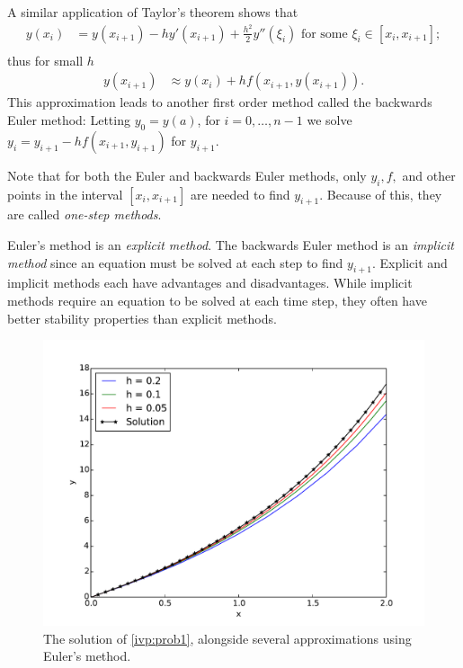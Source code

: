 A similar application of Taylor's theorem shows that
\begin{align*}
y(x_{i}) &= y(x_{i+1}) - h y'(x_{i+1}) + \frac{h^2}{2} y''(\xi_i) \text{ for some } \xi_i \in [x_i,x_{i+1}]; \\
\end{align*}
thus for small $h$
\begin{align*}
y(x_{i+1}) &\approx  y(x_{i}) + h f(x_{i+1},y(x_{i+1})).
\end{align*}
This approximation leads to another first order method called the backwards Euler method: Letting $y_0 = y(a)$, for $i = 0, \hdots, n-1$ we  solve  $y_{i} = y_{i+1}-hf(x_{i+1},y_{i+1})$ for $y_{i+1}$.

Note that for both the Euler and backwards Euler methods, only $y_i, f,$ and other points in the interval $[x_i, x_{i+1}]$ are needed to find $y_{i+1}$. 
Because of this, they are called \textit{one-step methods}.

Euler's method is an \textit{explicit method}. 
The backwards Euler method is an \textit{implicit method} since an equation must be solved at each step to find $y_{i+1}$. 
Explicit and implicit methods each have advantages and disadvantages. 
While implicit methods require an equation to be solved at each time step, they often have better stability properties than explicit methods.

\begin{figure}[ht]
\centering
\includegraphics[width=\textwidth]{prob1.pdf}
\caption{The solution of \eqref{ivp:prob1}, alongside several approximations using Euler's method.}
\label{ivp:euler}
\end{figure}


